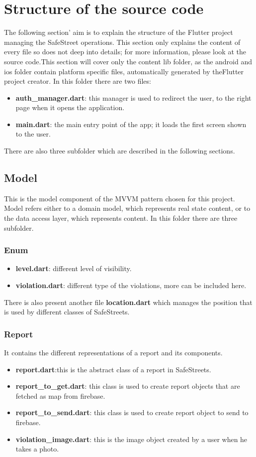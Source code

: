 \documentclass[../ITD.tex]{subfiles}
\begin{document}
    \chapter{Structure of the source code}\label{ch:structure-of-the-source-code}
    The following section' aim is to explain the structure of the Flutter project managing the SafeStreet operations. This section only explains the content of every file so does not deep into details; for more information, please look at the source code.This section will cover only the content lib folder, as the android and ios folder contain platform specific files, automatically generated by theFlutter project creator.
    In this folder there are two files:
    \begin{itemize}
        \item \textbf{auth\_manager.dart}: this manager is used to redirect the user, to the right page when it opens the application.
        \item \textbf{main.dart}: the main entry point of the app; it loads the first screen shown to the user.
    \end{itemize}
    There are also three subfolder which are described in the following sections.
    \section{Model}\label{sec:model}
    This is the model component of the MVVM pattern chosen for this project.
    Model refers either to a domain model, which represents real state content, or to the data access layer, which represents content.
    In this folder there are three subfolder.
    \subsection{Enum}\label{subsec:enum}
    \begin{itemize}
        \item \textbf{level.dart}: different level of visibility.
        \item \textbf{violation.dart}: different type of the violations, more can be included here.
    \end{itemize}
    There is also present another file \textbf{location.dart} which manages the position that is used by different classes of SafeStreets.
    \subsection{Report}\label{subsec:report}
    It contains the different representations of a report and its components.
    \begin{itemize}
        \item \textbf{report.dart}:this is the abstract class of a report in SafeStreets.
        \item \textbf{report\_to\_get.dart}: this class is used to create report objects that are fetched as map from firebase.
        \item \textbf{report\_to\_send.dart}: this class is used to create report object to send to firebase.
        \item \textbf{violation\_image.dart}: this is the image object created by a user when he takes a photo.
    \end{itemize}
\end{document}
